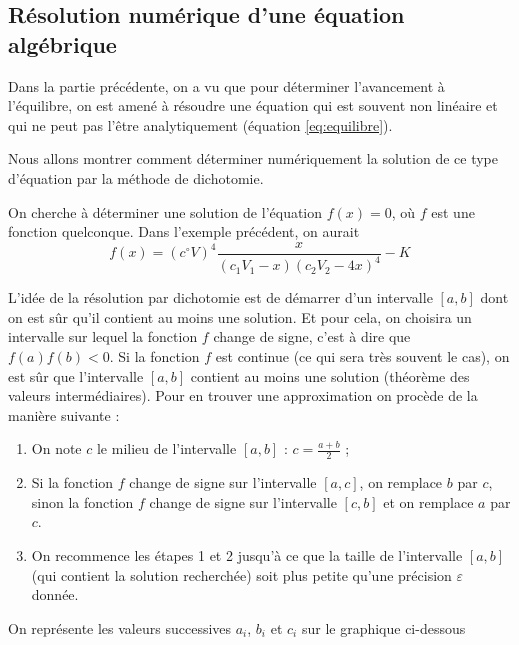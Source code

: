 \documentclass[MPSI]{cours}
\begin{document}
\subsection{Résolution numérique d'une équation algébrique}%
\label{sub:resolution_numerique_d_une_equation}

Dans la partie précédente, on a vu que pour déterminer l'avancement à l'équilibre, on est amené à résoudre une équation qui est souvent non linéaire et qui ne peut pas l'être analytiquement (équation \ref{eq:equilibre}).

Nous allons montrer comment déterminer numériquement la solution de ce type d'équation par la méthode de dichotomie.

On cherche à déterminer une solution de l'équation $f(x)=0$, où $f$ est une fonction quelconque. Dans l'exemple précédent, on aurait 
\begin{equation}
  f(x) = (c^\circ{}V)^4 \frac{x}{(c_1V_1-x)(c_2V_2-4x)^4}-K
\end{equation}

L'idée de la résolution par dichotomie est de démarrer d'un intervalle $[a, b]$ dont on est sûr qu'il contient au moins une solution. Et pour cela, on choisira un intervalle sur lequel la fonction $f$ change de signe, c'est à dire que $f(a)f(b)<0$. Si la fonction $f$ est continue (ce qui sera très souvent le cas), on est sûr que l'intervalle $[a, b]$ contient au moins une solution (théorème des valeurs intermédiaires). Pour en trouver une approximation on procède de la manière suivante :
\begin{enumerate}
  \item On note $c$ le milieu de l'intervalle $[a, b]$ : $c=\frac{a+b}{2}$ ;
  \item Si la fonction $f$ change de signe sur l'intervalle $[a, c]$, on remplace $b$ par $c$, sinon la fonction $f$ change de signe sur l'intervalle $[c, b]$ et on remplace $a$ par $c$. 
  \item On recommence les étapes 1 et 2 jusqu'à ce que la taille de l'intervalle $[a, b]$ (qui contient la solution recherchée) soit plus petite qu'une précision $\varepsilon$ donnée.
\end{enumerate}

On représente les valeurs successives $a_i$, $b_i$ et $c_i$  sur le graphique ci-dessous
\end{document}
